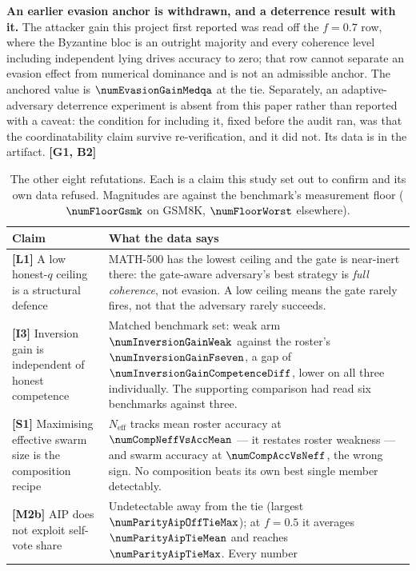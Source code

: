\textbf{An earlier evasion anchor is withdrawn, and a deterrence result with it.}
The attacker gain this project first reported was read off the $f=0.7$ row, where
the Byzantine bloc is an outright majority and every coherence level including
independent lying drives accuracy to zero; that row cannot separate an evasion
effect from numerical dominance and is not an admissible anchor. The anchored
value is $\numEvasionGainMedqa$ at the tie. Separately, an adaptive-adversary
deterrence experiment is absent from this paper rather than reported with a
caveat: the condition for including it, fixed before the audit ran, was that the
coordinatability claim survive re-verification, and it did not. Its data is in
the artifact. \textbf{[G1, B2]}

\begin{table}[t]
\centering
\caption{The other eight refutations. Each is a claim this study set out to
confirm and its own data refused. Magnitudes are against the benchmark's
measurement floor ($\numFloorGsmk$ on GSM8K, $\numFloorWorst$ elsewhere).}
\label{tab:refutations}
\footnotesize
\begin{tabular}{@{}p{}p{}@{}}
\toprule
Claim & What the data says \\
\midrule
\textbf{[L1]} A low honest-$q$ ceiling is a structural defence &
MATH-500 has the lowest ceiling and the gate is near-inert there: the gate-aware
adversary's best strategy is \emph{full coherence}, not evasion. A low ceiling
means the gate rarely fires, not that the adversary rarely succeeds. \\
\addlinespace
\textbf{[I3]} Inversion gain is independent of honest competence &
Matched benchmark set: weak arm $\numInversionGainWeak$ against the roster's
$\numInversionGainFseven$, a gap of $\numInversionGainCompetenceDiff$, lower on
all three individually. The supporting comparison had read six benchmarks against
three. \\
\addlinespace
\textbf{[S1]} Maximising effective swarm size is the composition recipe &
$N_{\mathrm{eff}}$ tracks mean roster accuracy at $\numCompNeffVsAccMean$ --- it
restates roster weakness --- and swarm accuracy at $\numCompAccVsNeff$, the wrong
sign. No composition beats its own best single member detectably. \\
\addlinespace
\textbf{[M2b]} AIP does not exploit self-vote share &
Undetectable away from the tie (largest $\numParityAipOffTieMax$); at $f=0.5$ it
averages $\numParityAipTieMean$ and reaches $\numParityAipTieMax$. Every number

\end{tabular}
\end{table}
